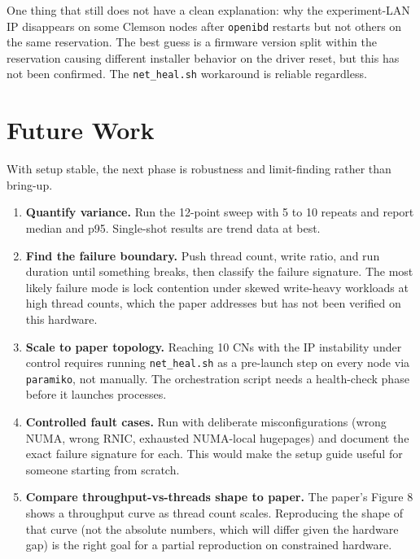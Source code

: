 \documentclass[10pt]{article}
\begin{document}
One thing that still does not have a clean explanation: why the experiment-LAN IP
disappears on some Clemson nodes after \texttt{openibd} restarts but not others
on the same reservation.
The best guess is a firmware version split within the reservation causing different
installer behavior on the driver reset, but this has not been confirmed.
The \texttt{net\_heal.sh} workaround is reliable regardless.

\section{Future Work}

With setup stable, the next phase is robustness and limit-finding rather than
bring-up.

\begin{enumerate}[nosep]
  \item \textbf{Quantify variance.}
    Run the 12-point sweep with 5 to 10 repeats and report median and p95.
    Single-shot results are trend data at best.

  \item \textbf{Find the failure boundary.}
    Push thread count, write ratio, and run duration until something breaks,
    then classify the failure signature.
    The most likely failure mode is lock contention under skewed write-heavy
    workloads at high thread counts, which the paper addresses but has not been
    verified on this hardware.

  \item \textbf{Scale to paper topology.}
    Reaching 10 CNs with the IP instability under control requires running
    \texttt{net\_heal.sh} as a pre-launch step on every node via \texttt{paramiko},
    not manually.
    The orchestration script needs a health-check phase before it launches processes.

  \item \textbf{Controlled fault cases.}
    Run with deliberate misconfigurations (wrong NUMA, wrong RNIC, exhausted
    NUMA-local hugepages) and document the exact failure signature for each.
    This would make the setup guide useful for someone starting from scratch.

  \item \textbf{Compare throughput-vs-threads shape to paper.}
    The paper's Figure 8 shows a throughput curve as thread count scales.
    Reproducing the shape of that curve (not the absolute numbers, which will differ
    given the hardware gap) is the right goal for a partial reproduction
    on constrained hardware.
\end{enumerate}
\end{document}
